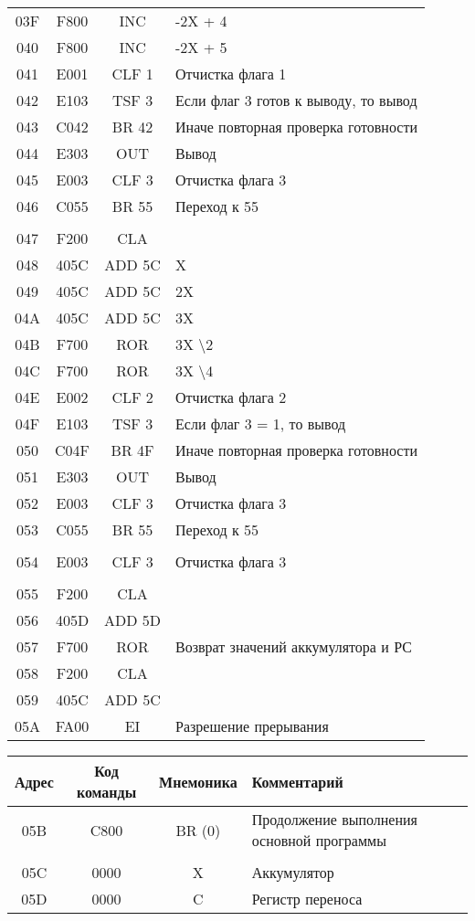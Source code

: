 \documentclass[a4paper,14pt]{article}
\begin{document}
\begin{tabular}{|c|c|c|l|}
03F& F800 & INC & -2X + 4\\
040& F800 & INC & -2X + 5\\
041& E001 & CLF 1 & Отчистка флага 1\\
042& E103 & TSF 3 & Если флаг 3 готов к выводу, то вывод\\
043& C042 & BR 42 & Иначе повторная проверка готовности\\
044& E303 & OUT & Вывод\\
045& E003 & CLF 3 & Отчистка флага 3\\
046& C055 & BR 55 & Переход к 55\\
& & &\\
047& F200 & CLA & \\
048& 405C & ADD 5C & X\\
049& 405C & ADD 5C & 2X\\
04A& 405C & ADD 5C & 3X\\
04B& F700 & ROR & 3X \backslash 2\\
04C& F700 & ROR & 3X \backslash 4\\
04E& E002 & CLF 2 & Отчистка флага 2\\
04F& E103 & TSF 3 & Если флаг 3 = 1, то вывод\\
050& C04F & BR 4F & Иначе повторная проверка готовности\\
051& E303 & OUT & Вывод\\
052& E003 & CLF 3 & Отчистка флага 3\\
053& C055 & BR 55 & Переход к 55\\
& & &\\
054& E003 & CLF 3 & Отчистка флага 3\\
& & &\\
055& F200 & CLA & \\
056& 405D & ADD 5D & \\
057& F700 & ROR & Возврат значений аккумулятора и РС\\
058& F200 & CLA & \\
059& 405C & ADD 5C & \\
05A& FA00 & EI & Разрешение прерывания\\
    \hline
\end{tabular}

\newpage
\begin{tabular}{|c|c|c|l|}
\hline
\textbf{Адрес} & \textbf{Код команды} & \textbf{Мнемоника} & \textbf{Комментарий} \\\hline
    05B& C800 & BR (0) & Продолжение выполнения основной программы\\
    & & &\\
    05C& 0000 & X & Аккумулятор\\
    05D& 0000 & C & Регистр переноса\\
\hline
\end{tabular}
\end{document}
